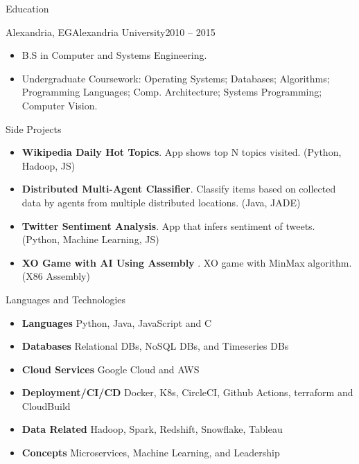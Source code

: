 \documentclass[]{ahmedamrcv}
\begin{document}
	\begin{cvsection}{Education}
		\begin{cvsubsection}{Alexandria, EG}{Alexandria University}{2010 -- 2015}
			\begin{itemize}
				\item B.S in Computer and Systems Engineering.
				\item Undergraduate Coursework: Operating Systems; Databases; Algorithms; Programming Languages; Comp. Architecture; Systems Programming; Computer Vision.
			\end{itemize}
		\end{cvsubsection}
	\end{cvsection}
	
	\begin{cvsection}{Side Projects}
		\begin{cvsubsection}{}{}{}
			\begin{itemize}
    			\item \textbf{Wikipedia Daily Hot Topics}. App shows top N topics visited. (Python, Hadoop, JS)
				\item \textbf{Distributed Multi-Agent Classifier}. Classify items based on collected data by agents from multiple distributed locations. (Java, JADE)
				\item \textbf{Twitter Sentiment Analysis}. App that infers sentiment of tweets. (Python, Machine Learning, JS)
				\item \textbf{XO Game with AI Using Assembly }. XO game with MinMax algorithm. (X86 Assembly)
			\end{itemize}
		\end{cvsubsection}
	\end{cvsection}
	

	\begin{cvsection}{Languages and Technologies}
		\begin{cvsubsection}{}{}{}	
			\begin{itemize}
				\item \textbf{Languages} Python, Java, JavaScript and C
				\item \textbf{Databases}  Relational DBs, NoSQL DBs, and Timeseries DBs
				\item \textbf{Cloud Services}  Google Cloud and AWS
				\item \textbf{Deployment/CI/CD}  Docker, K8s, CircleCI, Github Actions, terraform and CloudBuild
				\item \textbf{Data Related}  Hadoop, Spark, Redshift, Snowflake, Tableau
				\item \textbf{Concepts}  Microservices, Machine Learning, and Leadership
			\end{itemize}
		\end{cvsubsection}
	\end{cvsection}
\end{document}
